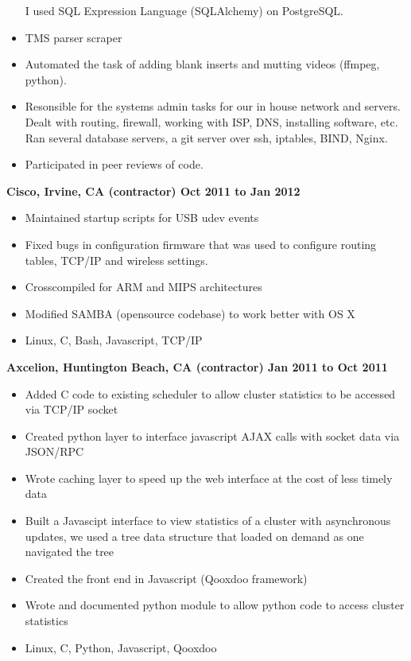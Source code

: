 \documentclass{res}
\begin{document}
\begin{resume}
\begin{itemize}
I used SQL Expression Language (SQLAlchemy) on PostgreSQL.

\item TMS parser scraper

\item Automated the task of adding blank inserts and mutting
videos (ffmpeg, python).

\item Resonsible for the systems admin tasks for our in house
network and servers.  Dealt with routing, firewall, working with ISP,
DNS, installing software, etc.  Ran several database servers, a git
server over ssh, iptables, BIND, Nginx.

\item Participated in peer reviews of code.
\end{itemize}

{\large \bf Cisco, Irvine, CA (contractor) \hfill Oct 2011 to Jan 2012}
\begin{itemize}
\item Maintained startup scripts for USB udev events
\item Fixed bugs in configuration firmware that was used to configure
 routing tables, TCP/IP and  wireless settings.
\item Crosscompiled for ARM and MIPS architectures
\item Modified SAMBA (opensource codebase) to work better with OS X
\item Linux, C, Bash, Javascript, TCP/IP
\end{itemize}

{\large \bf Axcelion, Huntington Beach, CA (contractor) \hfill Jan 2011 to Oct 2011}
\begin{itemize}
\item Added  C code to existing scheduler to allow cluster statistics to
be accessed via TCP/IP socket
\item Created python layer to interface javascript AJAX calls with
socket data via JSON/RPC
\item Wrote caching layer to speed up the web interface at the cost of
less timely data
\item Built a Javascipt interface to view statistics of a cluster with
asynchronous updates, we used a tree data structure that loaded on
demand as one navigated the tree
\item Created the front end in Javascript (Qooxdoo framework)
\item Wrote and documented python module to allow python code to
access cluster statistics
\item Linux, C, Python, Javascript, Qooxdoo
\end{itemize}


\end{resume}
\end{document}
